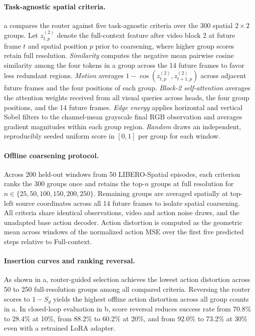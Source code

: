 \paragraph{Task-agnostic spatial criteria.}
    a compares the \method router against five task-agnostic criteria over the 300 spatial $2\times 2$ groups.
    Let $z^{(2)}_{t,p}$ denote the full-context feature after video block 2 at future frame $t$ and spatial position $p$ prior to coarsening, where higher group scores retain full resolution.
    \emph{Similarity} computes the negative mean pairwise cosine similarity among the four tokens in a group across the 14 future frames to favor less redundant regions.
    \emph{Motion} averages $1-\cos(z^{(2)}_{t,p},z^{(2)}_{t+1,p})$ across adjacent future frames and the four positions of each group.
    \emph{Block-2 self-attention} averages the attention weights received from all visual queries across heads, the four group positions, and the 14 future frames.
    \emph{Edge energy} applies horizontal and vertical Sobel filters to the channel-mean grayscale final RGB observation and averages gradient magnitudes within each group region.
    \emph{Random} draws an independent, reproducibly seeded uniform score in $[0,1]$ per group for each window.

\paragraph{Offline coarsening protocol.}
    Across 200 held-out windows from 50 LIBERO-Spatial episodes, each criterion ranks the 300 groups once and retains the top-$n$ groups at full resolution for $n\in\{25,50,100,150,200,250\}$.
    Remaining groups are averaged spatially at top-left source coordinates across all 14 future frames to isolate spatial coarsening.
    All criteria share identical observations, video and action noise draws, and the unadapted base action decoder.
    Action distortion is computed as the geometric mean across windows of the normalized action MSE over the first five predicted steps relative to Full-context.

\paragraph{Insertion curves and ranking reversal.}
    As shown in a, router-guided selection achieves the lowest action distortion across 50 to 250 full-resolution groups among all compared criteria.
    Reversing the router scores to $1-S_g$ yields the highest offline action distortion across all group counts in a.
    In closed-loop evaluation in b, score reversal reduces success rate from 70.8\% to 28.4\% at 10\%, from 88.2\% to 60.2\% at 20\%, and from 92.0\% to 73.2\% at 30\% even with a retrained LoRA adapter.


